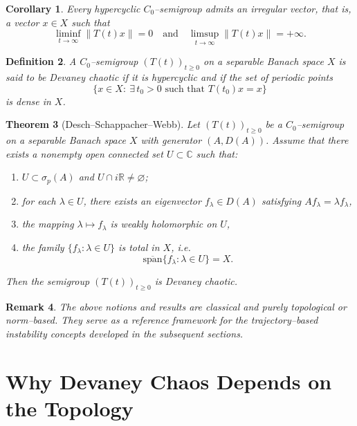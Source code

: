 \documentclass[12pt]{article}
\newtheorem{theorem}{Theorem}[section]
\newtheorem{definition}[theorem]{Definition}
\newtheorem{remark}[theorem]{Remark}
\newtheorem{corollary}[theorem]{Corollary}
\begin{document}
\begin{corollary}\cite{BayartMatheron2009}
Every hypercyclic $C_0$--semigroup admits an \emph{irregular vector}, that is, a vector $x\in X$ such that
\[
\liminf_{t\to\infty}\|T(t)x\|=0
\quad\text{and}\quad
\limsup_{t\to\infty}\|T(t)x\|=+\infty.
\]
\end{corollary}


\begin{definition}\cite{DeschSchappacherWebb1997}
A $C_0$--semigroup $(T(t))_{t\ge0}$ on a separable Banach space $X$
is said to be \emph{Devaney chaotic} if it is hypercyclic and if the set of
periodic points
\[
\{x\in X:\ \exists\,t_0>0 \text{ such that } T(t_0)x=x\}
\]
is dense in $X$.
\end{definition}

\begin{theorem}[Desch--Schappacher--Webb]\cite{DeschSchappacherWebb1997}
\label{thm:DSW}
Let $(T(t))_{t\ge 0}$ be a $C_0$--semigroup on a separable Banach space $X$ with generator $(A,D(A))$. Assume that there exists a nonempty open connected set $U\subset\mathbb{C}$ such that:
\begin{enumerate}
\item $U\subset \sigma_p(A)$ and $U\cap i\mathbb{R}\neq\varnothing$;
\item for each $\lambda\in U$, there exists an eigenvector
$f_\lambda\in D(A)$ satisfying $Af_\lambda=\lambda f_\lambda$,
\item the mapping $\lambda\mapsto f_\lambda$ is weakly holomorphic on $U$,
\item the family $\{f_\lambda:\lambda\in U\}$ is total in $X$, i.e.
\[
\overline{\mathrm{span}}\{f_\lambda:\lambda\in U\}=X .
\]
\end{enumerate}
Then the semigroup $(T(t))_{t\ge 0}$ is Devaney chaotic.
\end{theorem}

\begin{remark}
The above notions and results are classical and purely topological or norm--based. They serve as a reference framework for the trajectory--based instability concepts developed in the subsequent sections.
\end{remark}

\section{Why Devaney Chaos Depends on the Topology}
\label{sec:topology_dependence}
\end{document}
